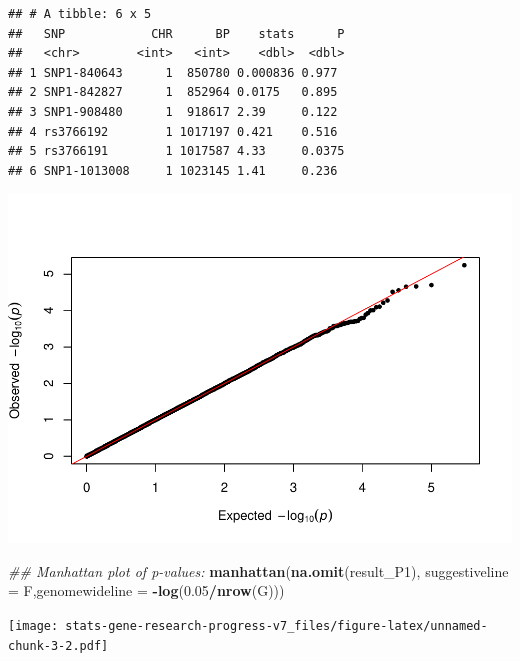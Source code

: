 \documentclass[
]{article}
\newenvironment{Shaded}{\begin{snugshade}}{\end{snugshade}}
\newcommand{\CommentTok}[1]{\textcolor[rgb]{0.56,0.35,0.01}{\textit{#1}}}
\newcommand{\DataTypeTok}[1]{\textcolor[rgb]{0.13,0.29,0.53}{#1}}
\newcommand{\FloatTok}[1]{\textcolor[rgb]{0.00,0.00,0.81}{#1}}
\newcommand{\KeywordTok}[1]{\textcolor[rgb]{0.13,0.29,0.53}{\textbf{#1}}}
\newcommand{\NormalTok}[1]{#1}
\newcommand{\OperatorTok}[1]{\textcolor[rgb]{0.81,0.36,0.00}{\textbf{#1}}}
\begin{document}
\begin{verbatim}
## # A tibble: 6 x 5
##   SNP            CHR      BP    stats      P
##   <chr>        <int>   <int>    <dbl>  <dbl>
## 1 SNP1-840643      1  850780 0.000836 0.977 
## 2 SNP1-842827      1  852964 0.0175   0.895 
## 3 SNP1-908480      1  918617 2.39     0.122 
## 4 rs3766192        1 1017197 0.421    0.516 
## 5 rs3766191        1 1017587 4.33     0.0375
## 6 SNP1-1013008     1 1023145 1.41     0.236
\end{verbatim}

\begin{Shaded}
\end{Shaded}

\includegraphics{stats-gene-research-progress-v7_files/figure-latex/unnamed-chunk-3-1.pdf}

\begin{Shaded}
\begin{Highlighting}[]
\CommentTok{## Manhattan plot of p-values:}
\KeywordTok{manhattan}\NormalTok{(}\KeywordTok{na.omit}\NormalTok{(result_P1), }\DataTypeTok{suggestiveline =}\NormalTok{ F,}\DataTypeTok{genomewideline =} \OperatorTok{-}\KeywordTok{log}\NormalTok{(}\FloatTok{0.05}\OperatorTok{/}\KeywordTok{nrow}\NormalTok{(G)))}
\end{Highlighting}
\end{Shaded}

\texttt{[image: stats-gene-research-progress-v7\_files/figure-latex/unnamed-chunk-3-2.pdf]}
\end{document}
